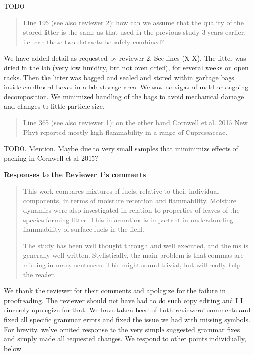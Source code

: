 \documentclass[letterpaper, 12pt]{letter}
\begin{document}
\begin{letter}{}
TODO

\begin{quote}
Line 196 (see also reviewer 2): how can we assume that the quality of the stored litter is the same as that used in the previous study 3 years earlier, i.e. can these two datasets be safely combined?
\end{quote}

We have added detail as requested by reviewer 2. See lines (X-X). The litter was dried in the lab (very low hmidity, but not oven dried), for several weeks on open racks. Then the litter was bagged and sealed and stored within garbage bags inside cardboard boxes in a lab storage area.  We saw no signs of mold or ongoing decomposition. We minimized handling of the bags to avoid mechanical damage and changes to little particle size.


\begin{quote}
Line 365 (see also reviewer 1): on the other hand Cornwell et al. 2015 New Phyt reported mostly high flammability in a range of Cupressaceae.
\end{quote}

TODO.  Mention.  Maybe due to very small samples that miminimize effects of packing in Cornwell et al 2015?



{\bf Responses to the Reviewer 1's comments}


\begin{quote}
This work compares mixtures of fuels, relative to their individual components, in terms of moisture retention and flammability. Moisture dynamics were also investigated in relation to properties of leaves of the species forming litter. This information is important in understanding flammability of surface fuels in the field. 

The study has been well thought through and well executed, and the ms is generally well written. Stylistically, the main problem is that commas are missing in many sentences. This might sound trivial, but will really help the reader.
\end{quote}

We thank the reviewer for their comments and apologize for the failure in proofreading. The reviewer should not have had to do such copy editing and I I sincerely apologize for that. We have taken heed of both reviewers' comments and fixed all specific grammar errors and fixed the issue we had with missing symbols. For brevity, we've omited response to the very simple suggested grammar fixes and simply made all requested changes. We respond to other points individually, below



\end{letter}
\end{document}
